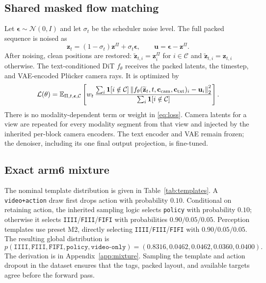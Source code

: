 \documentclass{article}
\newcommand{\code}[1]{\texttt{#1}}
\newcommand{\tabref}[1]{Table~\ref{#1}}
\newcommand{\appref}[1]{Appendix~\ref{#1}}
\newcommand{\given}{\mathcal{C}}
\begin{document}
\subsection{Shared masked flow matching}

Let $\boldsymbol\epsilon\sim\mathcal{N}(0,I)$ and let $\sigma_t$ be the scheduler noise level.
The full packed sequence is noised as
\begin{equation}
 \mathbf{z}_t=(1-\sigma_t)\mathbf{z}^{\Pi}+\sigma_t\boldsymbol\epsilon,
 \qquad \mathbf{u}=\boldsymbol\epsilon-\mathbf{z}^{\Pi}.
\label{eq:flow}
\end{equation}
After noising, clean positions are restored:
$\widetilde{\mathbf{z}}_{t,i}=\mathbf{z}^{\Pi}_i$ for $i\in\given$ and
$\widetilde{\mathbf{z}}_{t,i}=\mathbf{z}_{t,i}$ otherwise. The text-conditioned DiT
$f_\theta$ receives the packed latents, the timestep, and VAE-encoded Pl\"ucker camera rays.
It is optimized by
\begin{equation}
 \mathcal{L}(\theta)=
 \mathbb{E}_{\Pi,t,\boldsymbol\epsilon,\given}
 \left[
 w_t\,
 \frac{\sum_i \mathbf{1}[i\notin\given]
 \left\|f_\theta(\widetilde{\mathbf{z}}_t,t,\mathbf{c}_{\rm cam},
 \mathbf{c}_{\rm txt})_i-\mathbf{u}_i\right\|_2^2}
 {\sum_i\mathbf{1}[i\notin\given]}
 \right].
\label{eq:loss}
\end{equation}
There is no modality-dependent term or weight in \eqref{eq:loss}. Camera latents for a view are
repeated for every modality segment from that view and injected by the inherited per-block camera
encoders. The text encoder and VAE remain frozen; the denoiser, including its one final output
projection, is fine-tuned.

\subsection{Exact arm6 mixture}
\label{sec:mixture}

The nominal template distribution is given in \tabref{tab:templates}. A
\code{video+action} draw first drops action with probability $0.10$. Conditional on retaining
action, the inherited sampling logic selects \code{policy} with probability $0.10$; otherwise it
selects \code{IIII}/\code{FIII}/\code{FIFI} with probabilities $0.90/0.05/0.05$. Perception
templates use preset M2, directly selecting \code{IIII}/\code{FIII}/\code{FIFI} with
$0.90/0.05/0.05$. The resulting global distribution is
\begin{equation}
 p(\code{IIII},\code{FIII},\code{FIFI},\code{policy},\code{video-only})
 =(0.8316,0.0462,0.0462,0.0360,0.0400).
\label{eq:realizedmix}
\end{equation}
The derivation is in \appref{app:mixture}. Sampling the template and action dropout in the dataset
ensures that the tags, packed layout, and available targets agree before the forward pass.
\end{document}
